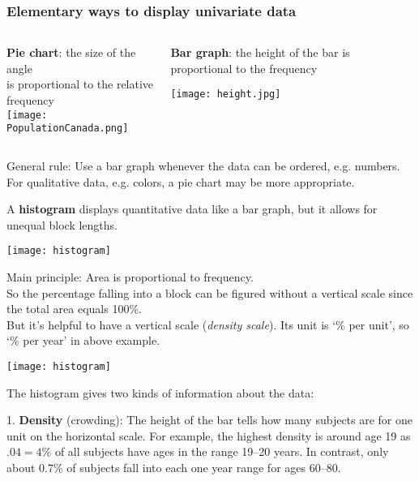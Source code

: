\documentclass{beamer}
\begin{document}
\begin{frame}
\frametitle{Elementary ways to display univariate data}

\begin{columns}[T]
\begin{column}{0.5\linewidth}
{\bf Pie chart}: the size of the angle\\
is proportional to the relative frequency\\
\texttt{[image: PopulationCanada.png]}
\end{column}
\begin{column}{0.5\linewidth}
{\bf Bar graph}: the height of the bar
is proportional to the frequency\\
\medskip

\texttt{[image: height.jpg]}
\end{column}
\end{columns}

General rule: Use a bar graph whenever the data can be ordered, e.g. numbers.
For qualitative data, e.g. colors, a pie chart may be more appropriate.
\end{frame}

\begin{frame}
A {\bf histogram} displays quantitative data like a bar graph, but it allows
for unequal block lengths. 
\medskip

\begin{center}
\texttt{[image: histogram]}
\end{center}

Main principle: Area is proportional to frequency.\\
So the percentage falling into a block can be figured without
a vertical scale since the total area equals 100\%.\\
But it's helpful to have a vertical scale ({\sl density scale}).
Its unit is `\% per unit', so `\% per year' in above example.\\
\end{frame}

\begin{frame}
\begin{center}
\texttt{[image: histogram]}
\end{center}

The histogram gives two kinds of information about the data:\\
\smallskip

1. {\bf Density} (crowding): The height of the bar tells how many subjects are
for one unit on the horizontal scale. For example, the highest density is around age 19 as
$.04=4\%$ of all subjects have ages in the range 19--20 years. In contrast, only about $0.7\%$ of
subjects fall into each one year range for ages 60--80. 
\end{frame}
\end{document}
